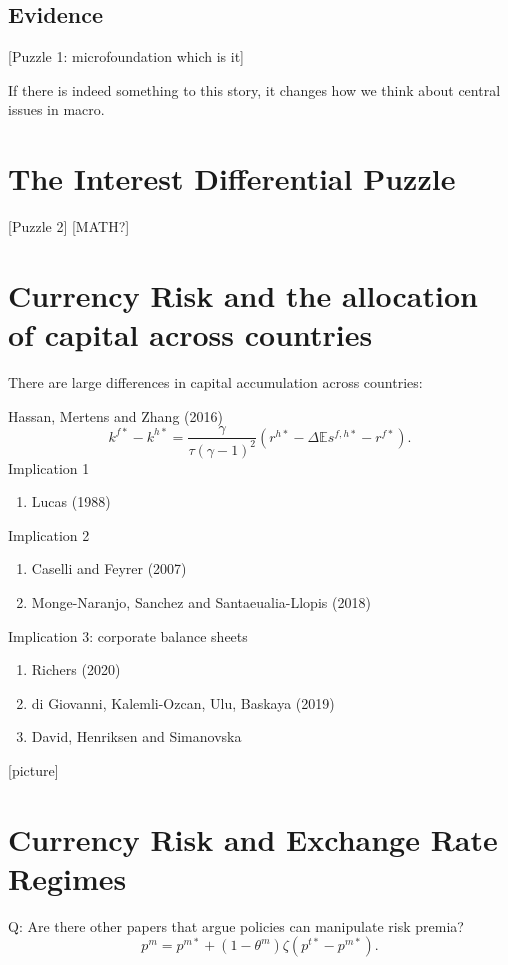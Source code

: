 \documentclass{ar-1col}
\begin{document}
\subsection{Evidence}

[Puzzle 1: microfoundation which is it]

If there is indeed something to this story, it changes how we think
about central issues in macro.



\section{The Interest Differential Puzzle}

[Puzzle 2]
[MATH?]

\section{Currency Risk and the allocation of capital across countries}
There are large differences in capital accumulation across countries:

Hassan, Mertens and Zhang (2016)
\begin{equation}\label{eq_link_k_r}
  k^{f\ast}-k^{h\ast} = \frac{\gamma}{\tau(\gamma-1)^2}\left(r^{h \ast} - \Delta \mathbb{E} s^{f, h \ast} - r^{f \ast}\right).
\end{equation}
Implication 1
\begin{enumerate}
\item Lucas (1988)
\end{enumerate}
Implication 2
\begin{enumerate}
\item Caselli and Feyrer (2007)
\item Monge-Naranjo, Sanchez and Santaeualia-Llopis (2018)
\end{enumerate}
Implication 3: corporate balance sheets
\begin{enumerate}
\item Richers (2020)
\item di Giovanni, Kalemli-Ozcan, Ulu, Baskaya (2019)
\item David, Henriksen and Simanovska
\end{enumerate} [picture]
\section{Currency Risk and Exchange Rate Regimes}
Q: Are there other papers that argue policies can manipulate risk
premia?
\begin{equation*}
  p^m = p^{m \ast} + (1 - \theta^m) \zeta (p^{t \ast} - p^{m \ast}).
\end{equation*}
\end{document}
